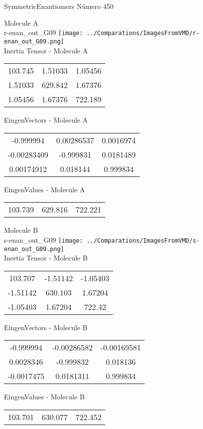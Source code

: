 \vtab[-2cm]
\begin{center}
{\large SymmetricEnantiomers \tab Número 450}
\end{center}
\begin{multicols}{2}
\begin{center}

Molecule A \\ 
r-enan\_out\_G09
\texttt{[image: ../Comparations/ImagesFromVMD/r-enan\_out\_G09.png]}
\\
Inertia Tensor - Molecule A \\
\vtab

\begin{tabular}{|c c c|}
103.745	 & 	1.51033	 & 	1.05456	 \\
1.51033	 & 	629.842	 & 	1.67376	 \\
1.05456	 & 	1.67376	 & 	722.189
\end{tabular}

\vtab
 EingenVectors - Molecule A     \\
\vtab
\begin{tabular}{|c c c|}
-0.999994	 & 	0.00286537	 & 	0.0016974	 \\
-0.00283409	 & 	-0.999831	 & 	0.0181489	 \\
0.00174912	 & 	0.018144	 & 	0.999834
\end{tabular}

\vtab
 EingenValues - Molecule A     \\
\vtab
\begin{tabular}{|c c c|}
103.739	 & 	629.816	 & 	722.221	 \\
\end{tabular}
\columnbreak

Molecule B \\ 
s-enan\_out\_G09
\texttt{[image: ../Comparations/ImagesFromVMD/s-enan\_out\_G09.png]}
\\
Inertia Tensor - Molecule B \\
\vtab

\begin{tabular}{|c c c|}
103.707	 & 	-1.51142	 & 	-1.05403	 \\
-1.51142	 & 	630.103	 & 	1.67204	 \\
-1.05403	 & 	1.67204	 & 	722.42
\end{tabular}

\vtab
 EingenVectors - Molecule B     \\
\vtab
\begin{tabular}{|c c c|}
-0.999994	 & 	-0.00286582	 & 	-0.00169581	 \\
0.0028346	 & 	-0.999832	 & 	0.018136	 \\
-0.0017475	 & 	0.0181311	 & 	0.999834
\end{tabular}

\vtab
 EingenValues - Molecule B     \\
\vtab
\begin{tabular}{|c c c|}
103.701	 & 	630.077	 & 	722.452	 \\
\end{tabular}

\end{center}
\end{multicols}
